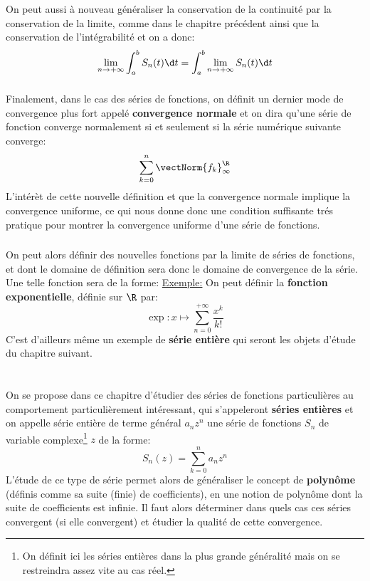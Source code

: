 On peut aussi à nouveau généraliser la conservation de la continuité par la conservation de la limite, comme dans le chapitre précédent ainsi que la conservation de l'intégrabilité et on a donc:
\[
   \lim_{n \rightarrow +\infty}\int_{a}^{b} S_n(t) \d t = \int_{a}^{b} \lim_{n \rightarrow +\infty} S_n(t) \d t
\]
\pagebreak
\subsection*{}
Finalement, dans le cas des séries de fonctions, on définit un dernier mode de convergence plus fort appelé \textbf{convergence normale} et on dira qu'une série de fonction converge normalement si et seulement si la série numérique suivante converge:
\[
   \sum_{k=0}^{n} \vectNorm{f_k}_\infty^\R   
\]
L'intérèt de cette nouvelle définition et que la convergence normale implique la convergence uniforme, ce qui nous donne donc une condition suffisante trés pratique pour montrer la convergence uniforme d'une série de fonctions.

\subsection*{}
On peut alors définir des nouvelles fonctions par la limite de séries de fonctions, et dont le domaine de définition sera donc le domaine de convergence de la série. Une telle fonction sera de la forme:
\underline{Exemple:} On peut définir la \textbf{fonction exponentielle}, définie sur \(\R\) par:
\[
   \exp: x \mapsto \sum_{n=0}^{+\infty} \frac{x^k}{k!}
\]
C'est d'ailleurs même un exemple de \textbf{série entière} qui seront les objets d'étude du chapitre suivant.
\chapter*{}
On se propose dans ce chapitre d'étudier des séries de fonctions particulières au comportement particulièrement intéressant, qui s'appeleront \textbf{séries entières} et on appelle série entière de terme général \(a_nz^n\) une série de fonctions \(S_n\) de variable complexe\footnote[1]{On définit ici les séries entières dans la plus grande généralité mais on se restreindra assez vite au cas réel.} \(z\) de la forme:
\[
   S_n(z) = \sum_{k=0}^{n} a_nz^n 
\]
L'étude de ce type de série permet alors de généraliser le concept de \textbf{polynôme} (définis comme sa suite (finie) de coefficients), en une notion de polynôme dont la suite de coefficients est infinie. Il faut alors déterminer dans quels cas ces séries convergent (si elle convergent) et étudier la qualité de cette convergence.

